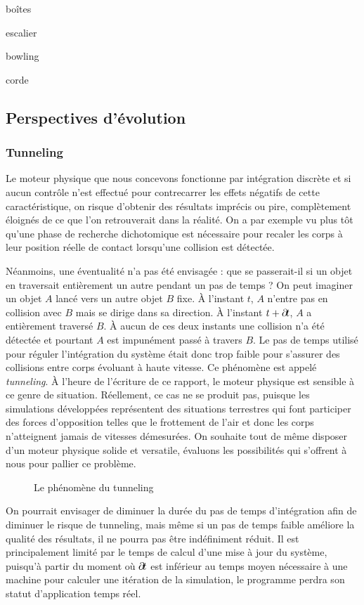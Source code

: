 boîtes

escalier

bowling

corde

\subsection{Perspectives d'évolution}

\subsubsection{Tunneling}

Le moteur physique que nous concevons fonctionne par intégration
discrète et si aucun contrôle n'est effectué pour contrecarrer les
effets négatifs de cette caractéristique, on risque d'obtenir des
résultats imprécis ou pire, complètement éloignés de ce que l'on
retrouverait dans la réalité. On a par exemple vu plus tôt qu'une
phase de recherche dichotomique est nécessaire pour recaler les corps
à leur position réelle de contact lorsqu'une collision est détectée.

Néanmoins, une éventualité n'a pas été envisagée : que se passerait-il
si un objet en traversait entièrement un autre pendant un pas de temps
? On peut imaginer un objet $A$ lancé vers un autre objet $B$
fixe. \`A l'instant $t$, $A$ n'entre pas en collision avec $B$ mais se
dirige dans sa direction. \`A l'instant $t + \partial \! t$, $A$ a
entièrement traversé $B$. \`A aucun de ces deux instants une collision
n'a été détectée et pourtant $A$ est impunément passé à travers
$B$. Le pas de temps utilisé pour réguler l'intégration du système
était donc trop faible pour s'assurer des collisions entre corps
évoluant à haute vitesse. Ce phénomène est appelé
\textit{tunneling}. \`A l'heure de l'écriture de ce rapport, le moteur
physique est sensible à ce genre de situation. Réellement, ce cas ne
se produit pas, puisque les simulations développées représentent des
situations terrestres qui font participer des forces d'opposition
telles que le frottement de l'air et donc les corps n'atteignent
jamais de vitesses démesurées. On souhaite tout de même disposer d'un
moteur physique solide et versatile, évaluons les possibilités qui
s'offrent à nous pour pallier ce problème.
\begin{figure}
  \centering
  
  \caption{Le phénomène du tunneling}
  \label{tunneling1}
\end{figure}

On pourrait envisager de diminuer la durée du pas de temps
d'intégration afin de diminuer le risque de tunneling, mais même si un
pas de temps faible améliore la qualité des résultats, il ne pourra
pas être indéfiniment réduit. Il est principalement limité par le
temps de calcul d'une mise à jour du système, puisqu'à partir du
moment o\`u $\partial \! t$ est inférieur au temps moyen nécessaire à une
machine pour calculer une itération de la simulation, le programme
perdra son statut d'application temps réel.

